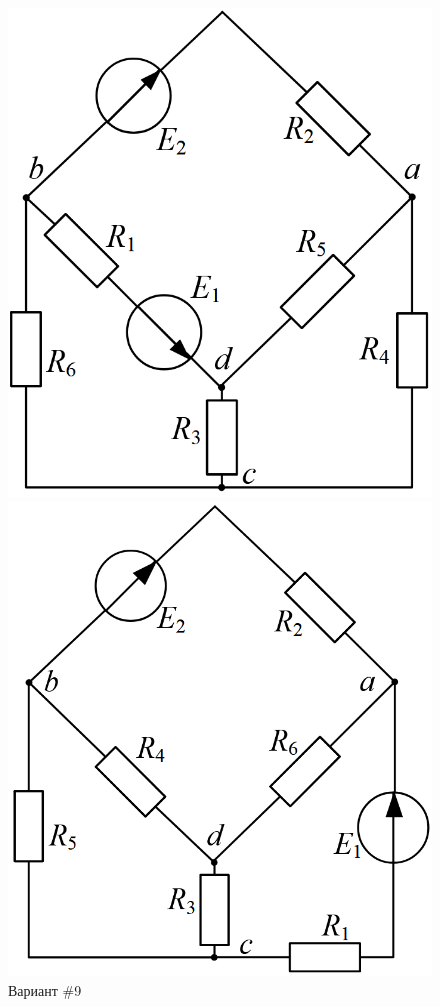 \begin{figure}[H]
    \centering
    \begin{minipage}{0.48\textwidth}
        \centering
        \includegraphics[width=\textwidth]{images/9_task.png}
        \caption{Вариант \#9}
        \label{fig:task_9}
    \end{minipage}
    \hfill
    \begin{minipage}{0.48\textwidth}
        \centering
        \includegraphics[width=\textwidth]{images/10_task.png}

\end{minipage}
\end{figure}
